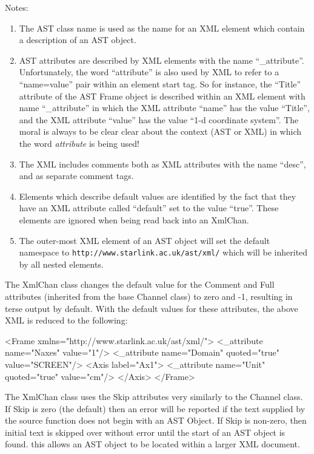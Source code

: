 \documentclass[twoside,11pt]{starlink}
\begin{document}
Notes:

\begin{enumerate}
\item The AST class name is used as the name for an XML element which contain
a description of an AST object.

\item AST attributes are described by XML elements with the name
``\_attribute''. Unfortunately, the word ``attribute'' is also used by XML
to refer to a ``name=value'' pair within an element start tag. So for
instance, the ``Title'' attribute of the AST Frame object is described
within an XML element with name ``\_attribute'' in which the XML attribute
``name'' has the value ``Title'', and the XML attribute ``value'' has the
value ``1-d coordinate system''. The moral is always to be clear clear
about the context (AST or XML) in which the word \emph{attribute} is being
used!

\item The XML includes comments both as XML attributes with the name ``desc'',
and as separate comment tags.

\item Elements which describe default values are identified by the fact
that they have an XML attribute called ``default'' set to the value
``true''. These elements are ignored when being read back into an XmlChan.

\item The outer-most XML element of an AST object will set the default
namespace to \verb+http://www.starlink.ac.uk/ast/xml/+ which will be
inherited by all nested elements.

\end{enumerate}


The XmlChan class changes the default value for the Comment and Full
attributes (inherited from the base Channel class) to zero and -1,
resulting in terse output by default. With the default values for these
attributes, the above XML is reduced to the following:

\small
\begin{terminalv}
 <Frame xmlns="http://www.starlink.ac.uk/ast/xml/">
    <_attribute name="Naxes" value="1"/>
    <_attribute name="Domain" quoted="true" value="SCREEN"/>
    <Axis label="Ax1">
       <_attribute name="Unit" quoted="true" value="cm"/>
    </Axis>
 </Frame>
\end{terminalv}
\normalsize


The XmlChan class uses the Skip attributes very similarly to the Channel
class. If Skip is zero (the default) then an error will be reported if the text
supplied by the source function does not begin with an AST Object. If
Skip is non-zero, then initial text is skipped over without error until
the start of an AST object is found. this allows an AST object to be
located within a larger XML document.
\end{document}
